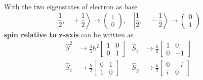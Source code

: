 With the two eigenstates of electron as base
\begin{equation*}
    \left|\frac{1}{2},\quad +\frac{1}{2}\right> \rightarrow \left(\begin{matrix}
                                                                            1 \\
                                                                            0
                                                                        \end{matrix}\right),\quad 
    \left|\frac{1}{2},\quad -\frac{1}{2}\right> \rightarrow \left(\begin{matrix}
                                                                            0 \\
                                                                            1
                                                                        \end{matrix}\right)
\end{equation*}
\textbf{spin relative to z-axis} can be written as
\begin{align*}
    \widehat{S}^2   & \rightarrow \frac{3}{4}{\hbar}^2\begin{bmatrix}
                                                          1 & 0 \\
                                                          0 & 1
                                                      \end{bmatrix} &
    \widehat{S}_{z} & \rightarrow \frac{\hbar}{2}\begin{bmatrix}
                                                     1 & 0  \\
                                                     0 & -1
                                                 \end{bmatrix}       \\
    \widehat{S}_{x} & \rightarrow \frac{\hbar}{2}\begin{bmatrix}
                                                     0 & 1 \\
                                                     1 & 0
                                                 \end{bmatrix}      &
    \widehat{S}_{y} & \rightarrow \frac{\hbar}{2}\begin{bmatrix}
                                                     0 & -i \\
                                                     i & 0
                                                 \end{bmatrix}
\end{align*}

